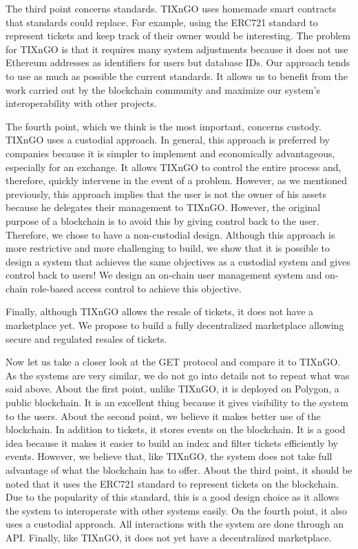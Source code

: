 \documentclass[a4paper,11pt,oneside]{report}
\begin{document}
The third point concerns standards. TIXnGO uses homemade smart contracts that standards could replace. For example, using the ERC721 standard to represent tickets and keep track of their owner would be interesting. The problem for TIXnGO is that it requires many system adjustments because it does not use Ethereum addresses as identifiers for users but database IDs. Our approach tends to use as much as possible the current standards. It allows us to benefit from the work carried out by the blockchain community and maximize our system's interoperability with other projects.

The fourth point, which we think is the most important, concerns custody. TIXnGO uses a custodial approach. In general, this approach is preferred by companies because it is simpler to implement and economically advantageous, especially for an exchange. It allows TIXnGO to control the entire process and, therefore, quickly intervene in the event of a problem. However, as we mentioned previously, this approach implies that the user is not the owner of his assets because he delegates their management to TIXnGO. However, the original purpose of a blockchain is to avoid this by giving control back to the user. Therefore, we chose to have a non-custodial design. Although this approach is more restrictive and more challenging to build, we show that it is possible to design a system that achieves the same objectives as a custodial system and gives control back to users! We design an on-chain user management system and on-chain role-based access control to achieve this objective.

Finally, although TIXnGO allows the resale of tickets, it does not have a marketplace yet. We propose to build a fully decentralized marketplace allowing secure and regulated resales of tickets.

Now let us take a closer look at the GET protocol and compare it to TIXnGO. As the systems are very similar,  we do not go into details not to repeat what was said above. About the first point, unlike TIXnGO, it is deployed on Polygon, a public blockchain. It is an excellent thing because it gives visibility to the system to the users. About the second point, we believe it makes better use of the blockchain. In addition to tickets, it stores events on the blockchain. It is a good idea because it makes it easier to build an index and filter tickets efficiently by events. However, we believe that, like TIXnGO, the system does not take full advantage of what the blockchain has to offer. About the third point, it should be noted that it uses the ERC721 standard to represent tickets on the blockchain. Due to the popularity of this standard, this is a good design choice as it allows the system to interoperate with other systems easily. On the fourth point, it also uses a custodial approach. All interactions with the system are done through an API. Finally, like TIXnGO, it does not yet have a decentralized marketplace.
\end{document}
